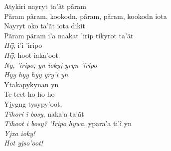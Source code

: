 \begin{linenumbers}\begingroup\raggedright

\noindent   Atykiri nayryt ta'ãt pãram\\
  Pãram pãram, kookodn, pãram, pãram, kookodn iota\\
  Nayryt oko ta'ãt iota dikit\\
  Pãram pãram i'a naakat 'irip tikyrot ta'ãt\\
  \emph{Hij̃}, i’i ’iripo\\
  \emph{Hij̃}, hoot iaka’oot\\
  \emph{Ny, 'iripo, yn iokyj yryn 'iripo}\\
  \emph{Hyy hyy hyy yry'i yn}\\
  Ytakapykynan yn\\
  Te teet ho ho ho\\
  Yjygng tysypy'oot,\\
  \emph{Tihori i bosy}, naka'a ta'ãt\\
  \emph{Tihoot i bosy?} \emph{‘Iripo hywa}, ypara’a ti’ĩ yn\\
  \emph{Yjxa ioky!}\\
  \emph{Hot yjso'oot!}

\end{linenumbers}\endgroup

